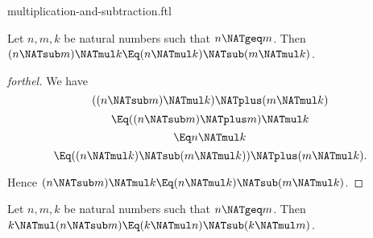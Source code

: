 \documentclass{stex}
\begin{document}
\begin{smodule}{multiplication-and-subtraction.ftl}

\begin{proposition}[forthel]
  Let $n, m, k$ be natural numbers such that $n \NATgeq m$.
  Then $(n \NATsub m) \NATmul k \Eq (n \NATmul k) \NATsub (m \NATmul k)$.
\end{proposition}
\begin{proof}[forthel]
  We have
  \[  ((n \NATsub m) \NATmul k) \NATplus (m \NATmul k)                 \]
  \[    \Eq ((n \NATsub m) \NATplus m) \NATmul k                       \]
  \[    \Eq n \NATmul k                                   \]
  \[    \Eq ((n \NATmul k) \NATsub (m \NATmul k)) \NATplus (m \NATmul k).  \]

  Hence $(n \NATsub m) \NATmul k \Eq (n \NATmul k) \NATsub (m \NATmul k)$.
\end{proof}

\begin{corollary}[forthel]
  Let $n, m, k$ be natural numbers such that $n \NATgeq m$.
  Then $k \NATmul (n \NATsub m) \Eq (k \NATmul n) \NATsub (k \NATmul m)$.
\end{corollary}
\end{smodule}
\end{document}

